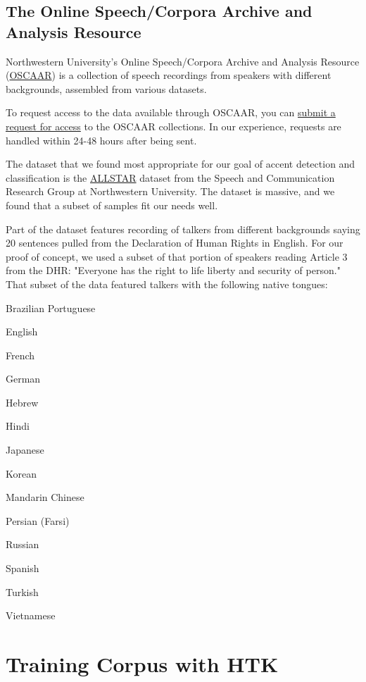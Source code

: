 \documentclass{wileySev}
\newenvironment{myitemize}{%
\begin{itemize}
\begin{multicols}{2}
}{%
\end{multicols}
\end{itemize}
}
\begin{document}
\section{The Online Speech/Corpora Archive and Analysis Resource}
Northwestern University's Online Speech/Corpora Archive and Analysis Resource (\href{https://oscaar.ci.northwestern.edu/}{OSCAAR}) is a collection of speech recordings from speakers with different backgrounds, assembled from various datasets.

To request access to the data available through OSCAAR, you can \href{https://oscaar.ci.northwestern.edu/requests.php}{submit a request for access} to the OSCAAR collections. In our experience, requests are handled within 24-48 hours after being sent.

The dataset that we found most appropriate for our goal of accent detection and classification is the \href{http://groups.linguistics.northwestern.edu/speech_comm_group/allsstar/}{ALLSTAR} dataset from the Speech and Communication Research Group at Northwestern University. The dataset is massive, and we found that a subset of samples fit our needs well.

Part of the dataset features recording of talkers from different backgrounds saying 20 sentences pulled from the Declaration of Human Rights in English. For our proof of concept, we used a subset of that portion of speakers reading Article 3 from the DHR: "Everyone has the right to life liberty and security of person." That subset of the data featured 
talkers with the following native tongues:
\begin{myitemize}
\item Brazilian Portuguese
\item English
\item French
\item German
\item Hebrew
\item Hindi
\item Japanese
\item Korean
\item Mandarin Chinese
\item Persian (Farsi)
\item Russian
\item Spanish
\item Turkish
\item Vietnamese
\end{myitemize}

\chapter{Training Corpus with HTK}
\end{document}
